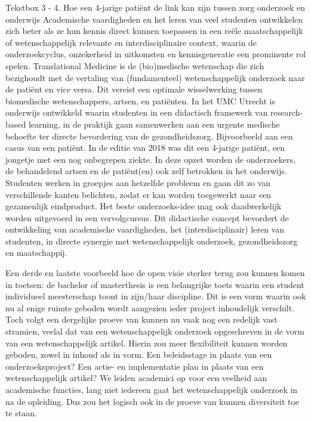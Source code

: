 \documentclass[smallauthor, chapterhaspagenum, nochapterinheader, pagenuminheader,  bigchapnum,medium2, tocpages,  garamond, titleinheader]{jote-book}
\begin{document}
	\begin{bookbox}{Tekstbox 3 - 4. Hoe een 4-jarige patiënt de link kan zijn tussen zorg onderzoek en onderwijs}
		Academische vaardigheden en het leren van veel studenten ontwikkelen zich beter als ze hun kennis direct kunnen toepassen in een reële maatschappelijk of wetenschappelijk relevante en interdisciplinaire context, waarin de onderzoekcyclus, onzekerheid in uitkomsten en kennisgeneratie een prominente rol spelen. Translational Medicine is de (bio)medische wetenschap die zich bezighoudt met de vertaling van (fundamenteel) wetenschappelijk onderzoek naar de patiënt en vice versa. Dit vereist een optimale wisselwerking tussen biomedische wetenschappers, artsen, en patiënten. In het UMC Utrecht is onderwijs ontwikkeld waarin studenten in een didactisch framewerk van research-based learning, in de praktijk gaan samenwerken aan een urgente medische behoefte ter directe bevordering van de gezondheidszorg. Bijvoorbeeld aan een casus van een patiënt. In de editie van 2018 was dit een 4-jarige patiënt, een jongetje met een nog onbegrepen ziekte. In deze opzet worden de onderzoekers, de behandelend artsen en de patiënt(en) ook zelf betrokken in het onderwijs. Studenten werken in groepjes aan hetzelfde probleem en gaan dit zo van verschillende kanten belichten, zodat er kan worden toegewerkt naar een gezamenlijk eindproduct. Het beste onderzoeks-idee mag ook daadwerkelijk worden uitgevoerd in een vervolgcursus. Dit didactische concept bevordert de ontwikkeling van academische vaardigheden, het (interdisciplinair) leren van studenten, in directe synergie met wetenschappelijk onderzoek, gezondheidszorg en maatschappij.
	\end{bookbox}

	Een derde en laatste voorbeeld hoe de open visie sterker terug zou kunnen komen in toetsen: de bachelor of masterthesis is een belangrijke toets waarin een student individueel meesterschap toont in zijn/haar discipline. Dit is een vorm waarin ook nu al enige ruimte geboden wordt aangezien ieder project inhoudelijk verschilt. Toch volgt een dergelijke proeve van kunnen nu vaak nog een redelijk vast stramien, veelal dat van een wetenschappelijk onderzoek opgeschreven in de vorm van een wetenschappelijk artikel. Hierin zou meer flexibiliteit kunnen worden geboden, zowel in inhoud als in vorm. Een beleidsstage in plaats van een onderzoeksproject? Een actie- en implementatie plan in plaats van een wetenschappelijk artikel? We leiden academici op voor een veelheid aan academische functies, lang niet iedereen gaat het wetenschappelijk onderzoek in na de opleiding. Dus zou het logisch ook in de proeve van kunnen diversiteit toe te staan.
\end{document}
